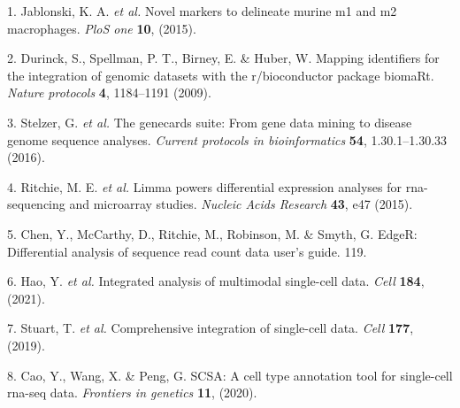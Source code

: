 \documentclass[
]{article}
\newenvironment{cslreferences}%
  {}%
  {\par}
\begin{document}
\hypertarget{refs}{}
\begin{cslreferences}
\leavevmode\hypertarget{ref-NovelMarkersTJablon2015}{}%
1. Jablonski, K. A. \emph{et al.} Novel markers to delineate murine m1 and m2 macrophages. \emph{PloS one} \textbf{10}, (2015).

\leavevmode\hypertarget{ref-MappingIdentifDurinc2009}{}%
2. Durinck, S., Spellman, P. T., Birney, E. \& Huber, W. Mapping identifiers for the integration of genomic datasets with the r/bioconductor package biomaRt. \emph{Nature protocols} \textbf{4}, 1184--1191 (2009).

\leavevmode\hypertarget{ref-TheGenecardsSStelze2016}{}%
3. Stelzer, G. \emph{et al.} The genecards suite: From gene data mining to disease genome sequence analyses. \emph{Current protocols in bioinformatics} \textbf{54}, 1.30.1--1.30.33 (2016).

\leavevmode\hypertarget{ref-LimmaPowersDiRitchi2015}{}%
4. Ritchie, M. E. \emph{et al.} Limma powers differential expression analyses for rna-sequencing and microarray studies. \emph{Nucleic Acids Research} \textbf{43}, e47 (2015).

\leavevmode\hypertarget{ref-EdgerDifferenChen}{}%
5. Chen, Y., McCarthy, D., Ritchie, M., Robinson, M. \& Smyth, G. EdgeR: Differential analysis of sequence read count data user's guide. 119.

\leavevmode\hypertarget{ref-IntegratedAnalHaoY2021}{}%
6. Hao, Y. \emph{et al.} Integrated analysis of multimodal single-cell data. \emph{Cell} \textbf{184}, (2021).

\leavevmode\hypertarget{ref-ComprehensiveIStuart2019}{}%
7. Stuart, T. \emph{et al.} Comprehensive integration of single-cell data. \emph{Cell} \textbf{177}, (2019).

\leavevmode\hypertarget{ref-ScsaACellTyCaoY2020}{}%
8. Cao, Y., Wang, X. \& Peng, G. SCSA: A cell type annotation tool for single-cell rna-seq data. \emph{Frontiers in genetics} \textbf{11}, (2020).
\end{cslreferences}
\end{document}
